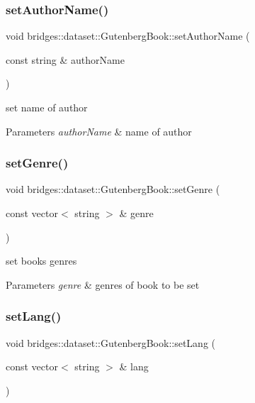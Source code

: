 \subsubsection{\texorpdfstring{set\+Author\+Name()}{setAuthorName()}}
{\footnotesize\ttfamily void bridges\+::dataset\+::\+Gutenberg\+Book\+::set\+Author\+Name (\begin{DoxyParamCaption}\item[{const string \&}]{author\+Name }\end{DoxyParamCaption})\hspace{0.3cm}{\ttfamily [inline]}}

set name of author 
\begin{DoxyParams}{Parameters}
{\em author\+Name} & name of author \\
\hline
\end{DoxyParams}
\mbox{\label{classbridges_1_1dataset_1_1_gutenberg_book_a2b0787215311029297ffab97c56d2eaa}} 
\subsubsection{\texorpdfstring{set\+Genre()}{setGenre()}}
{\footnotesize\ttfamily void bridges\+::dataset\+::\+Gutenberg\+Book\+::set\+Genre (\begin{DoxyParamCaption}\item[{const vector$<$ string $>$ \&}]{genre }\end{DoxyParamCaption})\hspace{0.3cm}{\ttfamily [inline]}}

set book\textquotesingle{}s genres 
\begin{DoxyParams}{Parameters}
{\em genre} & genres of book to be set \\
\hline
\end{DoxyParams}
\mbox{\label{classbridges_1_1dataset_1_1_gutenberg_book_aef718f3309b4959b04b7f8cc3e8f887e}} 
\subsubsection{\texorpdfstring{set\+Lang()}{setLang()}}
{\footnotesize\ttfamily void bridges\+::dataset\+::\+Gutenberg\+Book\+::set\+Lang (\begin{DoxyParamCaption}\item[{const vector$<$ string $>$ \&}]{lang }\end{DoxyParamCaption})\hspace{0.3cm}{\ttfamily [inline]}}

